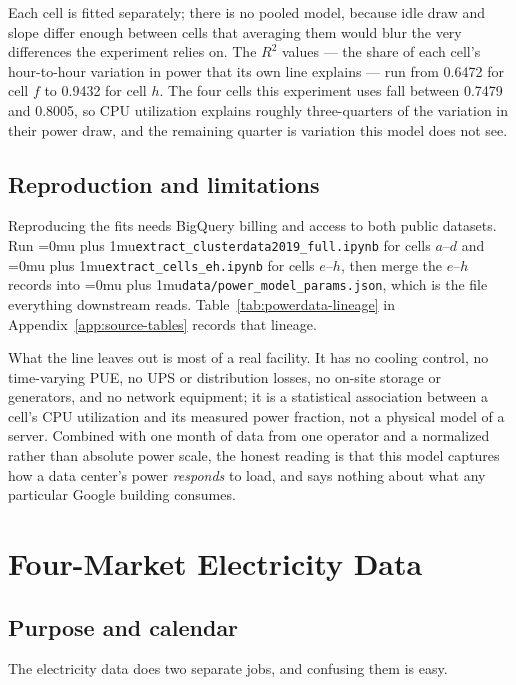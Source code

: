﻿\documentclass[12pt]{article}
\newcommand{\codepath}[1]{{\Urlmuskip=0mu plus 1mu\relax\nolinkurl{#1}}}
\begin{document}
Each cell is fitted separately; there is no pooled model, because idle draw and
slope differ enough between cells that averaging them would blur the very
differences the experiment relies on. The \(R^2\) values --- the share of each
cell's hour-to-hour variation in power that its own line explains --- run from
0.6472 for cell \(f\) to 0.9432 for cell \(h\). The four cells this experiment
uses fall between 0.7479 and 0.8005, so CPU utilization explains roughly
three-quarters of the variation in their power draw, and the remaining quarter
is variation this model does not see.

\subsection{Reproduction and limitations}
\label{subsec:powerdata-lineage}

Reproducing the fits needs BigQuery billing and access to both public datasets.
Run \codepath{extract_clusterdata2019_full.ipynb} for cells \(a\)--\(d\) and
\codepath{extract_cells_eh.ipynb} for cells \(e\)--\(h\), then merge the
\(e\)--\(h\) records into \codepath{data/power_model_params.json}, which is the
file everything downstream reads. Table~\ref{tab:powerdata-lineage} in
Appendix~\ref{app:source-tables} records that lineage.

What the line leaves out is most of a real facility. It has no cooling control,
no time-varying PUE, no UPS or distribution losses, no on-site storage or
generators, and no network equipment; it is a statistical association between a
cell's CPU utilization and its measured power fraction, not a physical model of
a server. Combined with one month of data from one operator and a
normalized rather than absolute power scale, the honest reading is that this
model captures how a data center's power \emph{responds} to load, and says
nothing about what any particular Google building consumes.

\section{Four-Market Electricity Data}
\label{sec:energy-data}

\subsection{Purpose and calendar}
\label{subsec:energy-purpose-calendar}

The electricity data does two separate jobs, and confusing them is easy.
\end{document}
